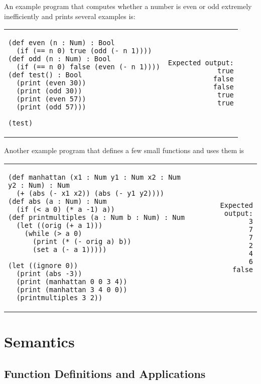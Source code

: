 \documentclass[10pt, oneside]{article}
\begin{document}
An example program that computes whether a number is even or odd extremely
inefficiently and prints several examples is:

\begin{tabular}{lr}
\begin{lstlisting}
(def even (n : Num) : Bool
  (if (== n 0) true (odd (- n 1))))
(def odd (n : Num) : Bool
  (if (== n 0) false (even (- n 1))))
(def test() : Bool
  (print (even 30))
  (print (odd 30))
  (print (even 57))
  (print (odd 57)))

(test)
\end{lstlisting}
& \hspace{5em}
\begin{lstlisting}
Expected output:
true
false
false
true
true
\end{lstlisting}
\end{tabular}

Another example program that defines a few small functions and uses them is

\begin{tabular}{lr}
\begin{lstlisting}
(def manhattan (x1 : Num y1 : Num x2 : Num y2 : Num) : Num
  (+ (abs (- x1 x2)) (abs (- y1 y2))))
(def abs (a : Num) : Num
  (if (< a 0) (* a -1) a))
(def printmultiples (a : Num b : Num) : Num
  (let ((orig (+ a 1)))
    (while (> a 0)
      (print (* (- orig a) b))
      (set a (- a 1)))))

(let ((ignore 0))
  (print (abs -3))
  (print (manhattan 0 0 3 4))
  (print (manhattan 3 4 0 0))
  (printmultiples 3 2))
\end{lstlisting}
& \hspace{5em}
\begin{lstlisting}
Expected output:
3
7
7
2
4
6
false
\end{lstlisting}
\end{tabular}

\section*{Semantics}

\subsection*{Function Definitions and Applications}
\end{document}
